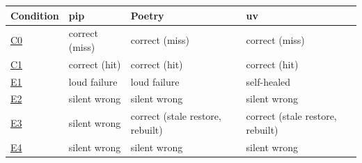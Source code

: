 \begin{tabular}{llll}
\toprule
Condition & pip & Poetry & uv \\
\midrule
\href{https://github.com/mark124/cache-key-soundness/blob/v1.0/results/table3_matrix.csv\#L2}{C0} & correct (miss) & correct (miss) & correct (miss) \\
\href{https://github.com/mark124/cache-key-soundness/blob/v1.0/results/table3_matrix.csv\#L3}{C1} & correct (hit) & correct (hit) & correct (hit) \\
\href{https://github.com/mark124/cache-key-soundness/blob/v1.0/results/table3_matrix.csv\#L4}{E1} & loud failure & loud failure & self-healed \\
\href{https://github.com/mark124/cache-key-soundness/blob/v1.0/results/table3_matrix.csv\#L5}{E2} & silent wrong & silent wrong & silent wrong \\
\href{https://github.com/mark124/cache-key-soundness/blob/v1.0/results/table3_matrix.csv\#L6}{E3} & silent wrong & correct (stale restore, rebuilt) & correct (stale restore, rebuilt) \\
\href{https://github.com/mark124/cache-key-soundness/blob/v1.0/results/table3_matrix.csv\#L7}{E4} & silent wrong & silent wrong & silent wrong \\
\bottomrule
\end{tabular}
